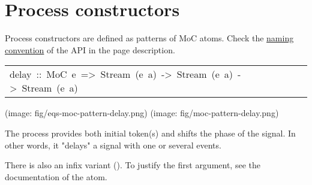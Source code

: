 \section{Process constructors}
Process constructors are defined as patterns of MoC
 atoms. Check the \href{#naming_conv}{naming convention} of the API in
 the page description.\par

\begin{haddockdesc}
\item[\begin{tabular}{@{}l}
delay\ ::\ MoC\ e\ =>\ Stream\ (e\ a)\ ->\ Stream\ (e\ a)\ ->\ Stream\ (e\ a)
\end{tabular}]\haddockbegindoc
(image: fig/eqs-moc-pattern-delay.png)
   (image: fig/moc-pattern-delay.png)\par
The  process provides both initial token(s) and shifts the
 phase of the signal. In other words, it "delays" a signal with
 one or several events.\par
There is also an infix variant  (). To justify the
 first argument, see the documentation of the \haddockid{-<-} atom.\par

\end{haddockdesc}
